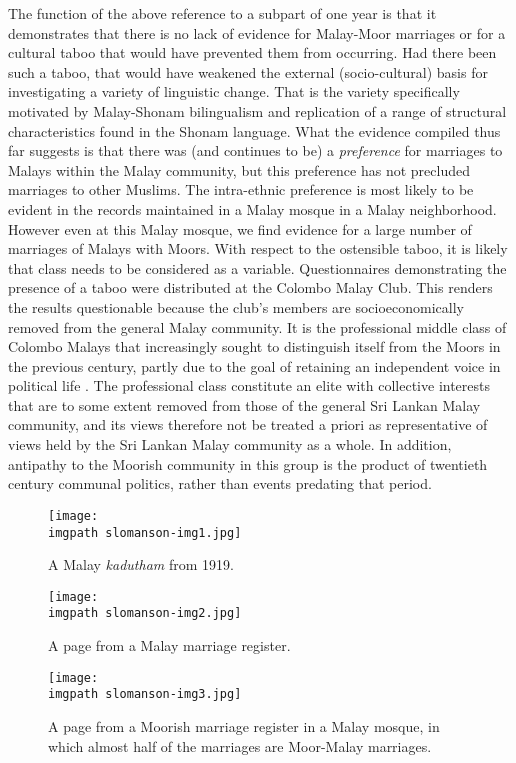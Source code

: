 The function of the above reference to a subpart of one year is that it demonstrates that there is no lack of evidence for Malay-Moor marriages or for a cultural taboo that would have prevented them from occurring. Had there been such a taboo, that would have weakened the external (socio-cultural) basis for investigating a variety of linguistic change. That is the variety specifically motivated by Malay-Shonam bilingualism and replication of a range of structural characteristics found in the Shonam language. What the evidence compiled thus far suggests is that there was (and continues to be) a \textit{preference} for marriages to Malays within the Malay community, but this preference has not precluded marriages to other Muslims. The intra-ethnic preference is most likely to be evident in the records maintained in a Malay mosque in a Malay neighborhood. However even at this Malay mosque, we find evidence for a large number of marriages of Malays with Moors. With respect to the ostensible taboo, it is likely that class needs to be considered as a variable. Questionnaires demonstrating the presence of a taboo were distributed at the Colombo Malay Club. This renders the results questionable because the club's members are socioeconomically removed from the general Malay community. It is the professional middle class of Colombo Malays that increasingly sought to distinguish itself from the Moors in the previous century, partly due to the goal of retaining an independent voice in political life \citep[16-18]{Hussainmiya1987}. The professional class constitute an elite with collective interests that are to some extent removed from those of the general Sri Lankan Malay community, and its views therefore not be treated a priori as representative of views held by the Sri Lankan Malay community as a whole. In addition, antipathy to the Moorish community in this group is the product of twentieth century communal politics, rather than events predating that period. 


\begin{figure}
\texttt{[image: \\imgpath slomanson-img1.jpg]}
\caption{A Malay \textit{kadutham} from 1919.}%
\end{figure}
 
\begin{figure}
\texttt{[image: \\imgpath slomanson-img2.jpg]}
\caption{A page from a Malay marriage register.} %
\end{figure}
 
\begin{figure}
\texttt{[image: \\imgpath slomanson-img3.jpg]}
\caption{A page from a Moorish marriage register in a Malay mosque, in which almost half of the marriages are Moor-Malay marriages.}%
\end{figure}
 

